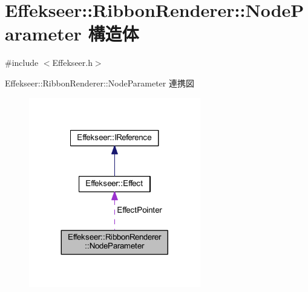 \hypertarget{struct_effekseer_1_1_ribbon_renderer_1_1_node_parameter}{}\section{Effekseer\+:\+:Ribbon\+Renderer\+:\+:Node\+Parameter 構造体}
\label{struct_effekseer_1_1_ribbon_renderer_1_1_node_parameter}


{\ttfamily \#include $<$Effekseer.\+h$>$}



Effekseer\+:\+:Ribbon\+Renderer\+:\+:Node\+Parameter 連携図\nopagebreak
\begin{figure}[H]
\begin{center}
\leavevmode
\includegraphics[width=212pt]{struct_effekseer_1_1_ribbon_renderer_1_1_node_parameter__coll__graph}
\end{center}
\end{figure}
